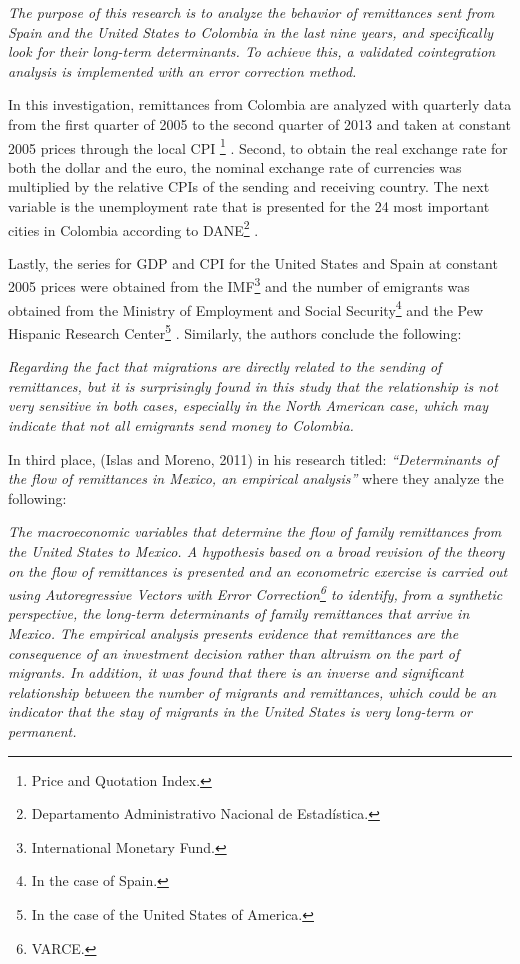 \documentclass[12pt,english, spanish]{smfart}
\begin{document}
\textit{The purpose of this research is to analyze the behavior of remittances sent from Spain and the United States to Colombia in the last nine years, and specifically look for their long-term determinants. To achieve this, a validated cointegration analysis is implemented with an error correction method.}\par
In this investigation, remittances from Colombia are analyzed with quarterly data from the first quarter of 2005 to the second quarter of 2013 and taken at constant 2005 prices through the local CPI \footnote{Price and Quotation Index.} . Second, to obtain the real exchange rate for both the dollar and the euro, the nominal exchange rate of currencies was multiplied by the relative CPIs of the sending and receiving country. The next variable is the unemployment rate that is presented for the 24 most important cities in Colombia according to DANE\footnote{Departamento Administrativo Nacional de Estadística.} .\par
Lastly, the series for GDP and CPI for the United States and Spain at constant 2005 prices were obtained from the IMF\footnote{International Monetary Fund.}  and the number of emigrants was obtained from the Ministry of Employment and Social Security\footnote{In the case of Spain.}  and the Pew Hispanic Research Center\footnote{In the case of the United States of America.} . Similarly, the authors conclude the following:\par
\textit{Regarding the fact that migrations are directly related to the sending of remittances, but it is surprisingly found in this study that the relationship is not very sensitive in both cases, especially in the North American case, which may indicate that not all emigrants send money to Colombia.}\par
In third place, (Islas and Moreno, 2011) in his research titled: \textit{“Determinants of the flow of remittances in Mexico, an empirical analysis”} where they analyze the following:\par
\textit{The macroeconomic variables that determine the flow of family remittances from the United States to Mexico. A hypothesis based on a broad revision of the theory on the flow of remittances is presented and an econometric exercise is carried out using Autoregressive Vectors with Error Correction\footnote{VARCE.}  to identify, from a synthetic perspective, the long-term determinants of family remittances that arrive in Mexico. The empirical analysis presents evidence that remittances are the consequence of an investment decision rather than altruism on the part of migrants. In addition, it was found that there is an inverse and significant relationship between the number of migrants and remittances, which could be an indicator that the stay of migrants in the United States is very long-term or permanent.}\par
\end{document}
